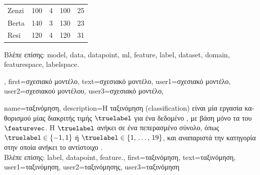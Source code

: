 {{\begin{table}[H]
\begin{tabular}{lcccc}
				\hline
				Zenzi & 100 & 4 & 100 & 25 \\
				Berta & 140 & 3 & 130 & 23 \\
				Resi  & 120 & 4 & 120 & 31 \\
				\hline
			\end{tabular}
		\end{table}
		\foreignlanguage{greek}{Βλέπε επίσης:} \gls{model}, \gls{data}, \gls{datapoint}, \gls{ml}, \gls{feature}, \gls{label}, \gls{dataset}, \gls{domain},
		\gls{featurespace}, \gls{labelspace}. }, 
	first={\foreignlanguage{greek}{σχεσιακό μοντέλο}},
	text={\foreignlanguage{greek}{σχεσιακό μοντέλο}},
	user1={\foreignlanguage{greek}{σχεσιακό μοντέλο}}, %
	user2={\foreignlanguage{greek}{σχεσιακού μοντέλου}}, %
	user3={\foreignlanguage{greek}{σχεσιακό μοντέλο}}, %
}

{name={\foreignlanguage{greek}{ταξινόμηση}},
	description={\foreignlanguage{greek}{Η ταξινόμηση} (classification) 
 		\foreignlanguage{greek}{είναι μία εργασία καθορισμού μίας}  \foreignlanguage{greek}{διακριτής τιμής} $\truelabel$ 
		\foreignlanguage{greek}{για ένα δεδομένο} , \foreignlanguage{greek}{με βάση μόνο τα}  
 		 \foreignlanguage{greek}{του} $\featurevec$. \foreignlanguage{greek}{Η}  $\truelabel$ 
		\foreignlanguage{greek}{ανήκει σε ένα πεπερασμένο σύνολο, όπως $\truelabel \in \{-1,1\}$ ή $\truelabel \in \{1, \,\ldots, \,19\}$, 
		και αναπαριστά την κατηγορία στην οποία ανήκει το αντίστοιχο} .
		\\
		\foreignlanguage{greek}{Βλέπε επίσης:} \gls{label}, \gls{datapoint}, \gls{feature}.},
	first={\foreignlanguage{greek}{ταξινόμηση}},
	text={\foreignlanguage{greek}{ταξινόμηση}},
	user1={\foreignlanguage{greek}{ταξινόμηση}}, %
	user2={\foreignlanguage{greek}{ταξινόμησης}}, %
	user3={\foreignlanguage{greek}{ταξινόμηση}} %
}

